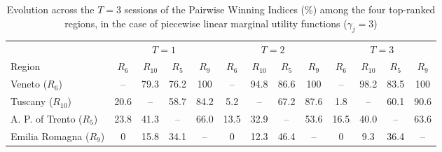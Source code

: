 \begin{table}[h!]
\centering
\footnotesize
\caption{Evolution across the $T=3$ sessions of the Pairwise Winning Indices (\%) among the four top-ranked regions, in the case of piecewise linear marginal utility functions ($\gamma_j=3$)}
\label{tab:pwi_evo_pw}
\begin{tabularx}{\textwidth}{l|CCCC|CCCC|CCCC}
\toprule
&&&\\
\cmidrule(lr){2-5}\cmidrule(lr){6-9}\cmidrule(lr){10-13}
Region&$R_{6}$&$R_{10}$&$R_{5}$&$R_{9}$&$R_{6}$&$R_{10}$&$R_{5}$&$R_{9}$&$R_{6}$&$R_{10}$&$R_{5}$&$R_{9}$\\
\midrule
Veneto ($R_{6}$)&--&79.3&76.2&100&--&94.8&86.6&100&--&98.2&83.5&100\\
Tuscany ($R_{10}$)&20.6&--&58.7&84.2&5.2&--&67.2&87.6&1.8&--&60.1&90.6\\
A. P. of Trento ($R_{5}$)&23.8&41.3&--&66.0&13.5&32.9&--&53.6&16.5&40.0&--&63.6\\
Emilia Romagna ($R_{9}$)&0&15.8&34.1&--&0&12.3&46.4&--&0&9.3&36.4&--\\
\bottomrule
\end{tabularx}
\end{table}

